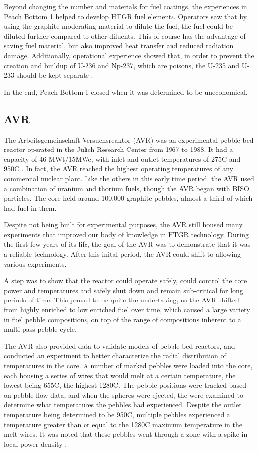 Beyond changing the number and materials for fuel coatings, the experiences in Peach Bottom 1 helped to develop HTGR fuel elements.  Operators saw that by using the graphite moderating material to dilute the fuel, the fuel could be diluted further compared to other diluents.  This of course has the advantage of saving fuel material, but also improved heat transfer and reduced radiation damage.  Additionally, operational experience showed that, in order to prevent the creation and buildup of U-236 and Np-237, which are poisons, the U-235 and U-233 should be kept separate \cite{simnad_early_1991}.

In the end, Peach Bottom 1 closed when it was determined to be uneconomical.

\subsection{AVR}

The Arbeitsgemeinschaft Versuchsreaktor (AVR) was an experimental pebble-bed reactor operated in the Jülich Research Center from 1967 to 1988.  It had a capacity of 46 MWt/15MWe, with inlet and outlet temperatures of 275\textdegree  C and 950\textdegree  C \cite{beck_high_nodate}.  In fact, the AVR reached the highest operating temperatures of any commercial nuclear plant.  Like the others in this early time period. the AVR used a combination of uranium and thorium fuels, though the AVR began with BISO particles.  The core held around 100,000 graphite pebbles, almost a third of which had fuel in them.

Despite not being built for experimental purposes, the AVR still housed many experiments that improved our body of knowledge in HTGR technology.  During the first few years of its life, the goal of the AVR was to demonstrate that it was a reliable technology.  After this inital period, the AVR could shift to allowing various experiments.

A step was to show that the reactor could operate safely, could control the core power and temperatures and safely shut down and remain sub-critical for long periods of time.  This proved to be quite the undertaking, as the AVR shifted from highly enriched to low enriched fuel over time, which caused a large variety in fuel pebble compositions, on top of the range of compositions inherent to a multi-pass pebble cycle.

The AVR also provided data to validate models of pebble-bed reactors, and conducted an experiment to better characterize the radial distribution of temperatures in the core.  A number of marked pebbles were loaded into the core, each housing a series of wires that would melt at a certain temperature, the lowest being 655\textdegree  C, the highest 1280\textdegree  C.  The pebble positions were tracked based on pebble flow data, and when the spheres were ejected, the were examined to determine what temperatures the pebbles had experienced.  Despite the outlet temperature being determined to be 950\textdegree  C, multiple pebbles experienced a temperature greater than or equal to the 1280\textdegree C maximum temperature in the melt wires.  It was noted that these pebbles went through a zone with a spike in local power density \cite{noauthor_results_1990}.


